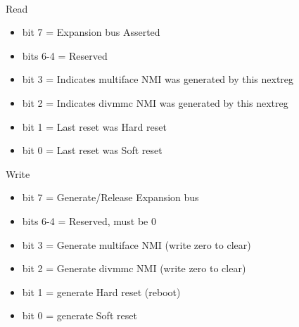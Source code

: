 \\
Read
\begin{itemize}
\item bit 7 = Expansion bus  Asserted
\item bits 6-4 = Reserved
\item bit 3 = Indicates multiface NMI was generated by this nextreg
\item bit 2 = Indicates divmmc NMI was generated by this nextreg
\item bit 1 = Last reset was Hard reset
\item bit 0 = Last reset was Soft reset
\end{itemize}
Write
\begin{itemize}
\item bit 7 = Generate/Release Expansion bus 
\item bits 6-4 = Reserved, must be 0
\item bit 3 = Generate multiface NMI (write zero to clear)
\item bit 2 = Generate divmmc NMI (write zero to clear)
\item bit 1 = generate Hard reset (reboot)
\item bit 0 = generate Soft reset
\end{itemize}


